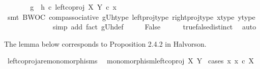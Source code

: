 \begin{isabellebody}
\ \ \isamarkupfalse%
\ \isamarkupfalse%
\ {\isachardoublequoteopen}{\isachardot}{\kern0pt}{\isachardot}{\kern0pt}{\isachardot}{\kern0pt}\ {\isacharequal}{\kern0pt}\ {\isacharparenleft}{\kern0pt}{\isacharparenleft}{\kern0pt}g\ {\isasymamalg}\ h{\isacharparenright}{\kern0pt}\ {\isasymcirc}\isactrlsub c\ {\isacharparenleft}{\kern0pt}left{\isacharunderscore}{\kern0pt}coproj\ X\ Y{\isacharparenright}{\kern0pt}{\isacharparenright}{\kern0pt}\ {\isasymcirc}\isactrlsub c\ x{\isachardoublequoteclose}\isanewline
\ \ \ \ \isamarkupfalse%
\ {\isacharparenleft}{\kern0pt}smt\ BWOC\ comp{\isacharunderscore}{\kern0pt}associative{}\ gUh{\isacharunderscore}{\kern0pt}type\ left{\isacharunderscore}{\kern0pt}proj{\isacharunderscore}{\kern0pt}type\ right{\isacharunderscore}{\kern0pt}proj{\isacharunderscore}{\kern0pt}type\ x{\isacharunderscore}{\kern0pt}type\ y{\isacharunderscore}{\kern0pt}type{\isacharparenright}{\kern0pt}\ \isanewline
\ \ \isamarkupfalse%
\ \isamarkupfalse%
\ {\isachardoublequoteopen}{\isachardot}{\kern0pt}{\isachardot}{\kern0pt}{\isachardot}{\kern0pt}\ {\isacharequal}{\kern0pt}\ {\isasymt}{\isachardoublequoteclose}\isanewline
\ \ \ \ \isamarkupfalse%
\ {\isacharparenleft}{\kern0pt}simp\ add{\isacharcolon}{\kern0pt}\ fact{}\ gUh{\isacharunderscore}{\kern0pt}def{\isacharparenright}{\kern0pt}\isanewline
\ \ \isamarkupfalse%
\ \isamarkupfalse%
\ False\isanewline
\ \ \ \ \isamarkupfalse%
\ true{\isacharunderscore}{\kern0pt}false{\isacharunderscore}{\kern0pt}distinct\ \isamarkupfalse%
\ auto\isanewline
{}\isamarkupfalse%
%
\endisatagproof
{\isafoldproof}%
%
\isadelimproof
%
\endisadelimproof
%
\begin{isamarkuptext}%
The lemma below corresponds to Proposition 2.4.2 in Halvorson.%
\end{isamarkuptext}\isamarkuptrue%
\isamarkupfalse%
\ left{\isacharunderscore}{\kern0pt}coproj{\isacharunderscore}{\kern0pt}are{\isacharunderscore}{\kern0pt}monomorphisms{\isacharcolon}{\kern0pt}\isanewline
\ \ {\isachardoublequoteopen}monomorphism{\isacharparenleft}{\kern0pt}left{\isacharunderscore}{\kern0pt}coproj\ X\ Y{\isacharparenright}{\kern0pt}{\isachardoublequoteclose}\isanewline
%
\isadelimproof
%
\endisadelimproof
%
\isatagproof
{}\isamarkupfalse%
\ {\isacharparenleft}{\kern0pt}cases\ {\isachardoublequoteopen}{\isasymexists}x{\isachardot}{\kern0pt}\ x\ {\isasymin}\isactrlsub c\ X{\isachardoublequoteclose}{\isacharparenright}{\kern0pt}\isanewline

\end{isabellebody}

